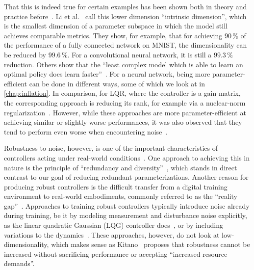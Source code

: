 That this is indeed true for certain examples has been shown both in theory and practice
before~\cite{Datar2025Universal,Montufar2015Geometry,Li2018Measuring}. Li et
al.~\cite{Li2018Measuring} call this lower dimension ``intrinsic dimension'', 
which is the smallest dimension of a parameter subspace in which the model
still achieves comparable metrics. They show, for example, that
for achieving $90\,\%$ of the performance of a fully connected network on MNIST,
the dimensionality can be reduced by $99.6\,\%$. For a convolutional neural
network, it is still a $99.3\,\%$ reduction.
Others show that the ``least complex model which is able to learn
an optimal policy does learn faster''~\cite[Sec.~6]{Montufar2015Geometry}. For a neural network, being
more parameter-efficient can be done in different ways, some of which we look at in
\cref{chap:inflation}. In comparison, for LQR, where the controller is a gain matrix, the
corresponding approach is reducing its rank, for example via a nuclear-norm regularization~\cite{Recht2010Guaranteed}.
However, while these approaches are more parameter-efficient at achieving similar or slightly worse performances, it
was also observed that they tend to perform even worse when encountering
noise~\cite{Datar2025Universal}.

Robustness to noise, however, is one of the important characteristics of controllers acting under
real-world conditions~\cite{Rao2001Naive,Roy2021MachineLearning}. One approach to achieving this
in nature is the principle of ``redundancy and diversity''~\cite[p.~828]{Kitano2004Biological}, which stands
in direct contrast to our goal of reducing redundant parameterizations. Another reason for producing
robust controllers is the difficult transfer from a digital training environment to real-world
embodiments, commonly referred to as the ``reality gap''~\cite{Tobin2017Domain,Peng2018SimToReal}.
Approaches to training robust controllers typically introduce noise already during training, be it by modeling
measurement and disturbance noise explicitly, as the linear quadratic Gaussian (LQG) controller
does~\cite[p.~89]{Rao2001Naive}, or by including variations to the
dynamics~\cite{Peng2018SimToReal}.
These approaches, however, do not look at low-dimensionality, which makes sense as
Kitano~\cite[p.~833]{Kitano2004Biological} proposes that robustness cannot be increased
without sacrificing performance or accepting ``increased resource
demands''.


